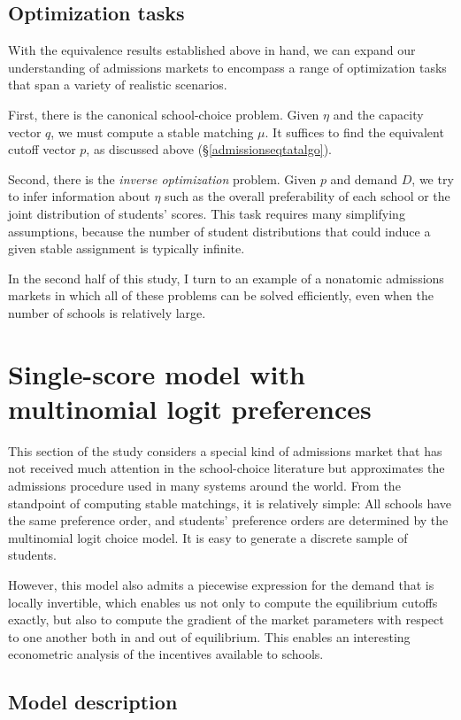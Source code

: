 \documentclass[12pt]{article}
\theoremstyle{definition}
\begin{document}
\subsection{Optimization tasks}
With the equivalence results established above in hand, we can expand our understanding of admissions markets to encompass a range of optimization tasks that span a variety of realistic scenarios.

First, there is the canonical school-choice problem. Given  $\eta$ and the capacity vector $q$, we must compute a stable matching $\mu$. It suffices to find the equivalent cutoff vector $p$, as discussed above (\S\ref{admissionseqtatalgo}).

Second, there is the \emph{inverse optimization} problem. Given $p$ and demand $D$, we try to infer information about $\eta$ such as the overall preferability of each school or the joint distribution of students' scores. This task requires many simplifying assumptions, because the number of student distributions that could induce a given stable assignment is typically infinite. 

In the second half of this study, I turn to an example of a nonatomic admissions markets in which all of these problems can be solved efficiently, even when the number of schools is relatively large. 

\section{Single-score model with multinomial logit preferences} \label{modeldescription}
This section of the study considers a special kind of admissions market that has not received much attention in the school-choice literature but approximates the admissions procedure used in many systems around the world. From the standpoint of computing stable matchings, it is relatively simple: All schools have the same preference order, and students' preference orders are determined by the multinomial logit choice model. It is easy to generate a discrete sample of students.

However, this model also admits a piecewise expression for the demand that is locally invertible, which enables us not only to compute the equilibrium cutoffs exactly, but also to compute the gradient of the market parameters with respect to one another both in and out of equilibrium. This enables an interesting econometric analysis of the incentives available to schools.

\subsection{Model description} 
\end{document}
